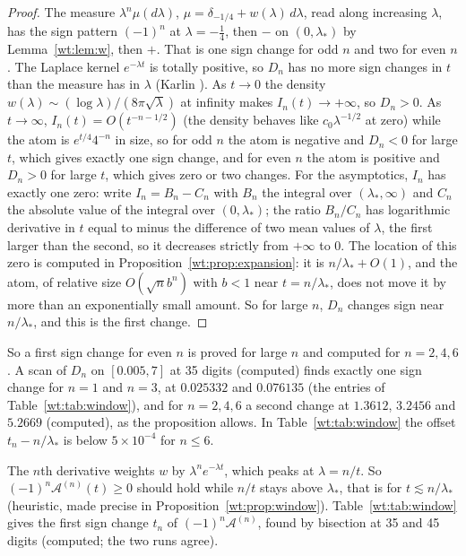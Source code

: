 \begin{proof}
The measure $\lambda^n\mu(d\lambda)$, $\mu=\delta_{-1/4}+w(\lambda)\,d\lambda$, read along increasing $\lambda$, has the sign pattern $(-1)^n$ at $\lambda=-\frac14$, then $-$ on $(0,\lambda_*)$ by Lemma~\ref{wt:lem:w}, then $+$. That is one sign change for odd $n$ and two for even $n$. The Laplace kernel $e^{-\lambda t}$ is totally positive, so $D_n$ has no more sign changes in $t$ than the measure has in $\lambda$ (Karlin \cite[Chapter 5]{Karlin68}). As $t\to0$ the density $w(\lambda)\sim(\log\lambda)/(8\pi\sqrt\lambda)$ at infinity makes $I_n(t)\to+\infty$, so $D_n>0$. As $t\to\infty$, $I_n(t)=O(t^{-n-1/2})$ (the density behaves like $c_0\lambda^{-1/2}$ at zero) while the atom is $e^{t/4}4^{-n}$ in size, so for odd $n$ the atom is negative and $D_n<0$ for large $t$, which gives exactly one sign change, and for even $n$ the atom is positive and $D_n>0$ for large $t$, which gives zero or two changes. For the asymptotics, $I_n$ has exactly one zero: write $I_n=B_n-C_n$ with $B_n$ the integral over $(\lambda_*,\infty)$ and $C_n$ the absolute value of the integral over $(0,\lambda_*)$; the ratio $B_n/C_n$ has logarithmic derivative in $t$ equal to minus the difference of two mean values of $\lambda$, the first larger than the second, so it decreases strictly from $+\infty$ to $0$. The location of this zero is computed in Proposition~\ref{wt:prop:expansion}: it is $n/\lambda_*+O(1)$, and the atom, of relative size $O(\sqrt nb^n)$ with $b<1$ near $t=n/\lambda_*$, does not move it by more than an exponentially small amount. So for large $n$, $D_n$ changes sign near $n/\lambda_*$, and this is the first change.
\end{proof}

So a first sign change for even $n$ is proved for large $n$ and computed for $n=2,4,6$. A scan of $D_n$ on $[0.005,7]$ at 35 digits (computed) finds exactly one sign change for $n=1$ and $n=3$, at $0.025332$ and $0.076135$ (the entries of Table~\ref{wt:tab:window}), and for $n=2,4,6$ a second change at $1.3612$, $3.2456$ and $5.2669$ (computed), as the proposition allows. In Table~\ref{wt:tab:window} the offset $t_n-n/\lambda_*$ is below $5\times10^{-4}$ for $n\le6$.

\begin{resultpar}\label{wt:res:window}
The $n$th derivative weights $w$ by $\lambda^ne^{-\lambda t}$, which peaks at $\lambda=n/t$. So $(-1)^n\mathcal A^{(n)}(t)\ge0$ should hold while $n/t$ stays above $\lambda_*$, that is for $t\lesssim n/\lambda_*$ (heuristic, made precise in Proposition~\ref{wt:prop:window}). Table~\ref{wt:tab:window} gives the first sign change $t_n$ of $(-1)^n\mathcal A^{(n)}$, found by bisection at 35 and 45 digits (computed; the two runs agree).\end{resultpar}

